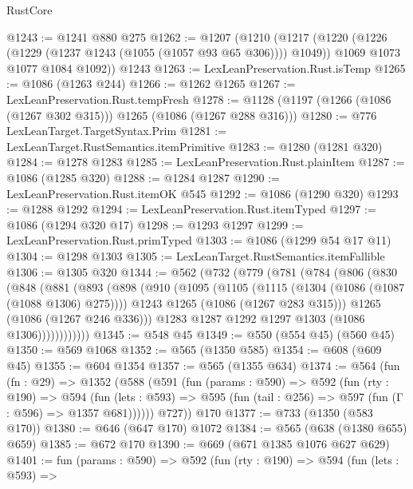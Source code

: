 \begin{lexlean}{RustCore}
\begin{coremodule}
{\begin{coremodule}
{{{{{{@1243 := @1241 @880 @275
@1262 := @1207
    (@1210
      (@1217
        (@1220 (@1226 (@1229 (@1237 @1243 (@1055 (@1057 @93 @65 @306)))) @1049))
        @1069
        @1073
        @1077
        @1084
        @1092))
    @1243
@1263 := LexLeanPreservation.Rust.isTemp
@1265 := @1086 (@1263 @244)
@1266 := @1262 @1265
@1267 := LexLeanPreservation.Rust.tempFresh
@1278 := @1128 (@1197 (@1266 (@1086 (@1267 @302 @315))) @1265 (@1086 (@1267 @288 @316)))
@1280 := @776 LexLeanTarget.TargetSyntax.Prim
@1281 := LexLeanTarget.RustSemantics.itemPrimitive
@1283 := @1280 (@1281 @320)
@1284 := @1278 @1283
@1285 := LexLeanPreservation.Rust.plainItem
@1287 := @1086 (@1285 @320)
@1288 := @1284 @1287
@1290 := LexLeanPreservation.Rust.itemOK @545
@1292 := @1086 (@1290 @320)
@1293 := @1288 @1292
@1294 := LexLeanPreservation.Rust.itemTyped
@1297 := @1086 (@1294 @320 @17)
@1298 := @1293 @1297
@1299 := LexLeanPreservation.Rust.primTyped
@1303 := @1086 (@1299 @54 @17 @11)
@1304 := @1298 @1303
@1305 := LexLeanTarget.RustSemantics.itemFallible
@1306 := @1305 @320
@1344 := @562
    (@732
      (@779
        (@781
          (@784
            (@806
              (@830
                (@848
                  (@881
                    (@893
                      (@898
                        (@910
                          (@1095
                            (@1105
                              (@1115 (@1304 (@1086 (@1087 (@1088 @1306) @275))))
                              @1243
                              @1265
                              (@1086 (@1267 @283 @315)))
                            @1265
                            (@1086 (@1267 @246 @336)))
                          @1283
                          @1287
                          @1292
                          @1297
                          @1303
                          (@1086 @1306))))))))))))
@1345 := @548 @45
@1349 := @550 (@554 @45) (@560 @45)
@1350 := @569 @1068
@1352 := @565 (@1350 @585)
@1354 := @608 (@609 @45)
@1355 := @604 @1354
@1357 := @565 (@1355 @634)
@1374 := @564
    (fun (fn : @29) =>
    @1352
      (@588
        (@591
          (fun (params : @590) =>
          @592
            (fun (rty : @190) =>
            @594
              (fun (lets : @593) =>
              @595 (fun (tail : @256) => @597 (fun (Γ : @596) => @1357 @681))))))
        @727))
    @170
@1377 := @733 (@1350 (@583 @170))
@1380 := @646 (@647 @170) @1072
@1384 := @565 (@638 (@1380 @655) @659)
@1385 := @672 @170
@1390 := @669 (@671 @1385 @1076 @627 @629)
@1401 := fun (params : @590) =>
  @592
    (fun (rty : @190) =>
    @594
      (fun (lets : @593) =>
}}}}}}
\end{coremodule}}
\end{coremodule}
\end{lexlean}
